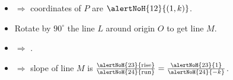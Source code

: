 \begin{frame}
\begin{columns}
\begin{itemize}
\item<12-> $\Rightarrow$ coordinates of $P$ are $\alertNoH{12}{(1,k)}$.
\item<13-> Rotate by $90^\circ$ the line $L$ around origin $O$ to get line $M$. 
\item<15-> $\Rightarrow$ .
\item<22-> $\Rightarrow$ slope of line $M$ is $\frac{\alertNoH{23}{\text{rise}}}{\alertNoH{24}{\text{run}}}=\frac{\alertNoH{23}{1}}{\alertNoH{24}{-k}}$.
\end{itemize}
\end{columns}


\end{frame}